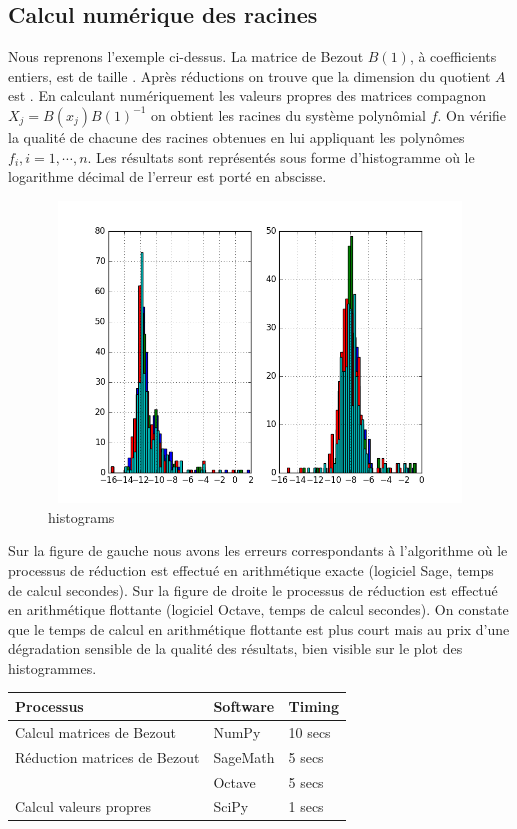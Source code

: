 \documentclass{standalone}
\begin{document}
  \subsection{Calcul numérique des racines}
  Nous reprenons l'exemple ci-dessus. La matrice de Bezout $B(1)$, à coefficients entiers, est de taille . Après réductions on trouve que la dimension du quotient $A$ est . En calculant numériquement les valeurs propres des matrices compagnon $X_j = B(x_j)B(1)^{-1}$ on obtient les racines du système polynômial $f$. On vérifie la qualité de chacune des racines obtenues en lui appliquant les polynômes $f_i, i=1,\cdots,n$. Les résultats sont représentés sous forme d'histogramme o\`u le logarithme décimal de l'erreur est porté en abscisse.
\begin{figure}[!ht]
  \includegraphics[height=8cm, width=1.2\textwidth]{../png/roots.png}
  \caption{histograms}
\end{figure}
Sur la figure de gauche nous avons les erreurs correspondants à l'algorithme o\`u le processus de réduction est effectué en arithmétique exacte (logiciel Sage, temps de calcul
 secondes). Sur la figure de droite le processus de réduction est effectué en arithmétique flottante (logiciel Octave, temps de calcul
 secondes). On constate que le temps de calcul en arithmétique flottante est plus court mais au prix d'une dégradation sensible de la qualité des résultats, bien visible sur le plot des histogrammes.
\begin{center}
\begin{tabular}{p{8cm}ll}
  Processus & Software & Timing \\ \hline
  Calcul matrices de Bezout & NumPy & 10 secs \\ \hline
  Réduction matrices de Bezout & SageMath & 5 secs \\
                              & Octave & 5 secs \\ \hline
  Calcul valeurs propres & SciPy & 1 secs \\ \hline
\end{tabular}
\end{center}
\end{document}
